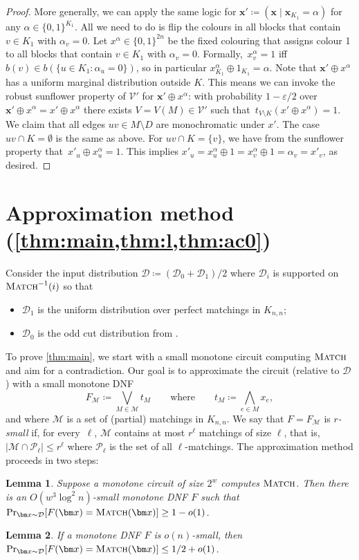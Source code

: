 \documentclass[11pt]{article}
\theoremstyle{plain}
\newtheorem{lemma}{Lemma}
\theoremstyle{definition}
\theoremstyle{remark}
\newcommand{\eps}{\varepsilon}
\newcommand{\PM}{\textsc{Match}}
\def\cald{{\mathcal D}}
\def\calm{{\mathcal M}}
\def\calp{{\mathcal P}}
\def\calv{{\mathcal V}}
\begin{document}
\begin{proof}
More generally, we can apply the same logic for $\bm x'\coloneqq (\bm x\mid \bm x_{K_1}=\alpha)$ for any $\alpha\in\{0,1\}^{K_1}$. All we need to do is flip the colours in all blocks that contain $v\in K_1$ with $\alpha_v=0$. Let $x^\alpha \in \{0,1\}^{2n}$ be the fixed colouring that assigns colour 1 to all blocks that contain $v\in K_1$ with $\alpha_v=0$. Formally,~$x^\alpha_v=1$ iff $b(v)\in b(\{u\in K_1:\alpha_u=0\})$, so in particular $x^\alpha_{K_1}\oplus 1_{K_1}=\alpha$. Note that $\bm x'\oplus x^\alpha$ has a uniform marginal distribution outside $K$. This means we can invoke the robust sunflower property of $\calv'$ for $\bm x' \oplus x^\alpha$: with probability $1-\eps/2$ over $\bm x'\oplus x^\alpha=x'\oplus x^\alpha$ there exists $V=V(M)\in\calv'$ such that~$t_{V \setminus K}(x'\oplus x^\alpha) = 1$. We claim that all edges $uv\in M\setminus D$ are monochromatic under $x'$. The case $uv\cap K=\emptyset$ is the same as above. For $uv\cap K=\{v\}$, we have from the sunflower property that~$x'_u\oplus x^\alpha_u=1$. This implies $x'_u=x^\alpha_u\oplus 1= x^\alpha_v\oplus 1=\alpha_v=x'_v$, as desired.
\end{proof}


\section{Approximation method \texorpdfstring{(\cref{thm:main,thm:l,thm:ac0})}{}}
\label{sec:approximation}

Consider the input distribution $\cald \coloneqq (\cald_0+\cald_1)/2$ where $\cald_i$ is supported on $\PM^{-1}(i)$ so that
\begin{itemize}[label=$-$,noitemsep]
    \item $\cald_1$ is the uniform distribution over perfect matchings in $K_{n,n}$;
    \item $\cald_0$ is the odd cut distribution from .
\end{itemize}
To prove \cref{thm:main}, we start with a small monotone circuit computing $\PM$ and aim for a contradiction. Our goal is to approximate the circuit (relative to $\cald$) with a small monotone DNF
\[
F_\calm \coloneqq \bigvee_{M\in\calm} t_M
\qquad\text{where}\qquad t_M\coloneqq \bigwedge_{e\in M} x_e,
\]
and where $\calm$ is a set of (partial) matchings in $K_{n,n}$. We say that $F=F_\calm$ is \emph{$r$-small} if, for every~$\ell$, $\calm$ contains at most $r^\ell$ matchings of size $\ell$, that is, $|\calm\cap\calp_\ell|\leq r^\ell$ where $\calp_\ell$ is the set of all $\ell$-matchings. The approximation method proceeds in two steps:
\begin{lemma}
    \label{lem:dnfs-approximate-intro}
    Suppose a monotone circuit of size $2^w$ computes $\PM$.
    Then there is an $O(w^3 \log^2 n)$-small
    monotone DNF $F$ such that
    $\Pr_{\bm x \sim \cald}[F(\bm x) = \PM(\bm x)] \geq 1-o(1)$.
\end{lemma}
\begin{lemma}
    \label{lem:dnfs-are-dumb-intro}
    If a monotone DNF $F$ is $o(n)$-small, then
    $\Pr_{\bm x \sim \cald}[F(\bm x) = \PM(\bm x)] \leq
    1/2+o(1)$.
\end{lemma}
\end{document}
